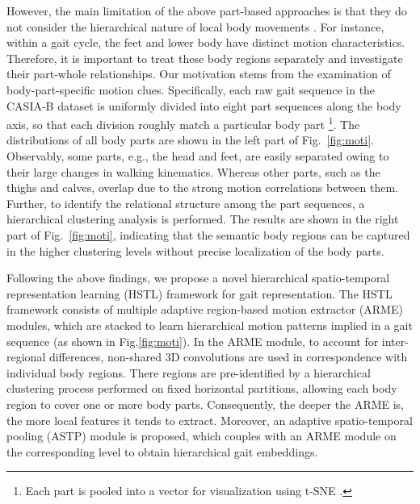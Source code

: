 \documentclass[10pt,twocolumn,letterpaper]{article}
\begin{document}
However, the main limitation of the above part-based approaches is that they do not consider the hierarchical nature of local body movements \cite{bideau2018best}. For instance, within a gait cycle, the feet and lower body have distinct motion characteristics. Therefore, it is important to treat these body regions separately and investigate their part-whole relationships. Our motivation stems from the examination of body-part-specific motion clues. Specifically, each raw gait sequence in the CASIA-B \cite{yu2006framework} dataset is uniformly divided into eight part sequences along the body axis, so that each division roughly match a particular body part \footnote{Each part is pooled into a vector for visualization using t-SNE \cite{van2008visualizing}.}. The distributions of all body parts are shown in the left part of Fig.~\ref{fig:moti}. Observably, some parts, e.g., the head and feet, are easily separated owing to their large changes in walking kinematics. Whereas other parts, such as the thighs and calves, overlap due to the strong motion correlations between them. Further, to identify the relational structure among the part sequences, a hierarchical clustering analysis \cite{ester1996density} is performed. The results are shown in the right part of Fig.~\ref{fig:moti}, indicating that the semantic body regions can be captured in the higher clustering levels without precise localization of the body parts.


Following the above findings, we propose a novel hierarchical spatio-temporal representation learning (HSTL) framework for gait representation. The HSTL framework consists of multiple adaptive region-based motion extractor (ARME) modules, which are stacked to learn hierarchical motion patterns implied in a gait sequence (as shown in Fig.\ref{fig:moti}). In the ARME module, to account for inter-regional differences, non-shared 3D convolutions are used in correspondence with individual body regions. There regions are pre-identified by a hierarchical clustering process performed on fixed horizontal partitions, allowing each body region to cover one or more body parts.  Consequently, the deeper the ARME is, the more local features it tends to extract. Moreover, an adaptive spatio-temporal pooling (ASTP) module is proposed, which couples with an ARME module on the corresponding level to obtain hierarchical gait embeddings.



\end{document}

